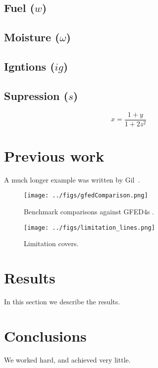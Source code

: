 \documentclass[12pt]{article}
\begin{document}
\subsection{Fuel ($w$)}

\subsection{Moisture ($\omega$)}

\subsection{Igntions ($ig$)}

\subsection{Supression ($s$)}




\begin{equation}
    x=\frac{1+y}{1+2z^2}
\end{equation}

\section{Previous work}\label{previous work}
A much longer \LaTeXe{} example was written by Gil~\cite{Gil:02}.


\begin{figure}[!ht]
  \centering
    \texttt{[image: ../figs/gfedComparison.png]}
   
  \caption{Benchmark comparisons against GFED4s \citep{Giglio2013}.}
\end{figure}


\begin{figure}[!ht]
  \centering
    \texttt{[image: ../figs/limitation\_lines.png]}
   
  \caption{Limitation covers.}
\end{figure}

\section{Results}\label{results}
In this section we describe the results.

\section{Conclusions}\label{conclusions}
We worked hard, and achieved very little.



\end{document}
